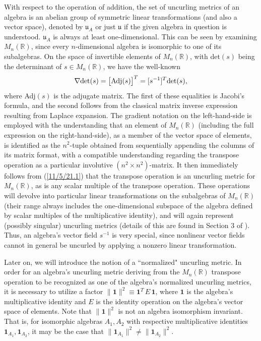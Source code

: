 \documentclass{amsart}
\numberwithin{equation}{section}
\theoremstyle{definition}
\numberwithin{theorem}{section}
\begin{document}
  With respect to the operation of addition, the set of uncurling metrics of an algebra is an abelian group of symmetric linear transformations (and also a vector space), denoted by $\mathfrak{u}_A$ or just $\mathfrak{u}$ if the given algebra in question is understood.  $\mathfrak{u}_A$ is always at least one-dimensional.  This can be seen by examining $M_n(\mathbb{R})$, since every $n$-dimensional algebra is isomorphic to one of its subalgebras.  On the space of invertible elements of $M_n(\mathbb{R})$, with det$(s)$ being the determinant of $s\in M_n(\mathbb{R})$, we have the well-known
  \begin{equation}\label{11/5/21.1} \nabla \mbox{det}(s) = \big[{\rm Adj}(s)\big]^T = [s^{-1}]^T\mbox{det}(s),\end{equation} where Adj$(s)$ is the adjugate matrix.  The first of these equalities is Jacobi's formula, and the second follows from the classical matrix inverse expression resulting from Laplace expansion.  The gradient notation on the left-hand-side is employed with the understanding that an element of $M_n(\mathbb{R})$ (including the full expression on the right-hand-side), as a member of the vector space of elements, is identified as the $n^2$-tuple obtained from sequentially appending the columns of its matrix format, with a compatible understanding regarding the transpose operation as a particular involutive $(n^2\times n^2)$-matrix.  It then immediately follows from (\ref{11/5/21.1}) that the transpose operation is an uncurling metric for $M_n(\mathbb{R})$, as is any scalar multiple of the transpose operation.  These operations will devolve into particular linear transformations on the subalgebras of $M_n(\mathbb{R})$ (their range always includes the one-dimensional subspace of the algebra defined by scalar multiples of the multiplicative identity), and will again represent (possibly singular) uncurling metrics (details of this are found in Section 3 of \cite{fgreensite:2023}).
    Thus, an algebra's vector field $s^{-1}$ is very special, since nonlinear vector fields cannot in general be uncurled by applying a nonzero linear transformation.
    
    

Later on, we will introduce the notion of a ``normalized" uncurling metric.  In order for an algebra's uncurling metric deriving from the $M_n(\mathbb{R})$ transpose operation to be recognized as one of the algebra's normalized uncurling metrics, it is necessary to utilize a factor $\|\mathbf{1}\|^2 \equiv \mathbf{1}^T \,E\, \mathbf{1}$, where $\mathbf{1}$ is the algebra's multiplicative identity and $E$ is the identity operation on the algebra's vector space of elements.  Note that $\|\mathbf{1}\|^2$ is not an algebra isomorphism invariant.  That is, for isomorphic algebras $A_1,A_2$ with respective multiplicative identities $\mathbf{1}_{A_1}, \mathbf{1}_{A_2}$, it may be the case that $\|\mathbf{1}_{A_1}\|^2 \ne \|\mathbf{1}_{A_2}\|^2$.
\end{document}
